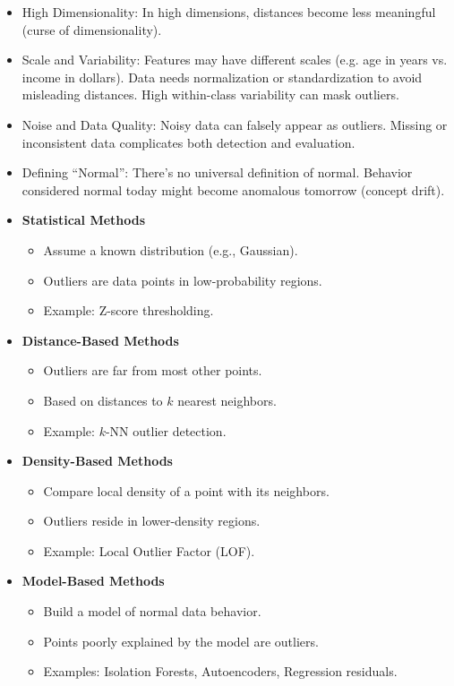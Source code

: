 \documentclass{article}
\begin{document}
\begin{itemize}
    \item High Dimensionality: In high dimensions, distances become less meaningful (curse of dimensionality).
    \item Scale and Variability: Features may have different scales (e.g. age in years vs. income in dollars). Data needs normalization or standardization to avoid misleading distances. High within-class variability can mask outliers.
    \item Noise and Data Quality: Noisy data can falsely appear as outliers. Missing or inconsistent data complicates both detection and evaluation.
    \item Defining “Normal”: There’s no universal definition of normal. Behavior considered normal today might become anomalous tomorrow (concept drift).
\end{itemize}

\begin{itemize}
  \item \textbf{Statistical Methods}
  \begin{itemize}
    \item Assume a known distribution (e.g., Gaussian).
    \item Outliers are data points in low-probability regions.
    \item Example: Z-score thresholding.
  \end{itemize}

  \item \textbf{Distance-Based Methods}
  \begin{itemize}
    \item Outliers are far from most other points.
    \item Based on distances to $k$ nearest neighbors.
    \item Example: $k$-NN outlier detection.
  \end{itemize}

  \item \textbf{Density-Based Methods}
  \begin{itemize}
    \item Compare local density of a point with its neighbors.
    \item Outliers reside in lower-density regions.
    \item Example: Local Outlier Factor (LOF).
  \end{itemize}

  \item \textbf{Model-Based Methods}
  \begin{itemize}
    \item Build a model of normal data behavior.
    \item Points poorly explained by the model are outliers.
    \item Examples: Isolation Forests, Autoencoders, Regression residuals.
  \end{itemize}
\end{itemize}
\end{document}
